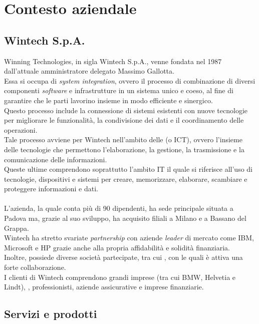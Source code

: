 \chapter{Contesto aziendale}
\label{cap:contestoAziendale}
\section{Wintech S.p.A.}
\noindent Winning Technologies, in sigla Wintech S.p.A., venne fondata nel 1987 dall'attuale amministratore delegato Massimo Gallotta.\\
Essa si occupa di \emph{system integration}, ovvero il processo di combinazione di diversi componenti \emph{software} e infrastrutture in un sistema unico e coeso, al fine di garantire che le parti lavorino insieme in modo efficiente e sinergico.\\
Questo processo include la connessione di sistemi esistenti con nuove tecnologie per migliorare le funzionalità, la condivisione dei dati e il coordinamento delle operazioni.\\
Tale processo avviene per Wintech nell'ambito delle  (o ICT), ovvero l'insieme delle tecnologie che permettono l'elaborazione, la gestione, la trasmissione e la comunicazione delle informazioni.\\
Queste ultime comprendono soprattutto l'ambito \gls{IT} il quale si riferisce all'uso di tecnologie, dispositivi e sistemi per creare, memorizzare, elaborare, scambiare e proteggere informazioni e dati.\\\\
L'azienda, la quale conta più di 90 dipendenti, ha sede principale situata a Padova ma, grazie al suo sviluppo, ha acquisito filiali a Milano e a Bassano del Grappa.\\
Wintech ha stretto svariate \emph{partnership} con aziende \emph{leader} di mercato come IBM, Microsoft e HP grazie anche alla propria affidabilità e solidità finanziaria.\\ 
Inoltre, possiede diverse società partecipate, tra cui , con le quali è attiva una forte collaborazione.\\
I clienti di Wintech comprendono grandi imprese (tra cui BMW, Helvetia e Lindt), , professionisti, aziende assicurative e imprese finanziarie.\\

\section{Servizi e prodotti}
